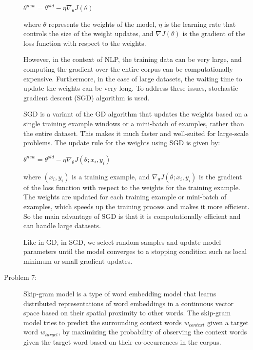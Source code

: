 \documentclass[12pt]{article}
\begin{document}
\begin{description}
  \begin{center}
    $\displaystyle{\theta^{new} = \theta^{old} - \eta \nabla_{\theta} J(\theta)}$
  \end{center}
  
  where $\theta$ represents the weights of the model, $\eta$ is the learning rate that controls the size of the weight updates, and $\nabla J(\theta)$ is the gradient of the 
  loss function with respect to the weights.

  However, in the context of NLP, the training data can be very large, and computing the gradient over the entire corpus can be computationally expensive. Furthermore, 
  in the case of large datasets, the waiting time to update the weights can be very long. To address these issues, stochastic gradient descent (SGD) algorithm is used.

  SGD is a variant of the GD algorithm that updates the weights based on a single training example windows or a mini-batch of examples, rather than the entire dataset. This makes it 
  much faster and well-suited for large-scale problems. The update rule for the weights using SGD is given by:

  \begin{center}
    $\displaystyle{\theta^{new} = \theta^{old} - \eta \nabla_{\theta} J(\theta; x_i, y_i)}$
  \end{center}

  where $(x_i, y_i)$ is a training example, and $\nabla_{\theta} J(\theta; x_i, y_i)$ is the gradient of the loss function with respect to the weights for the training example.
  The weights are updated for each training example or mini-batch of examples, which speeds up the training process and makes it more efficient. So the main advantage of SGD 
  is that it is computationally efficient and can handle large datasets.

  Like in GD, in SGD, we select random samples and update model parameters until the model converges to a stopping condition such as local minimum or small gradient updates.

  \pagebreak

  \item[Problem 7:] \hfill %
  
  Skip-gram model is a type of word embedding model that learns distributed representations of word embeddings in a continuous vector space based on their spatial proximity 
  to other words. The skip-gram model tries to predict the surrounding context words $w_{context}$ given a target word $w_{target}$, by maximizing the probability of observing
  the context words given the target word based on their co-occurrences in the corpus. 


\end{description}
\end{document}
